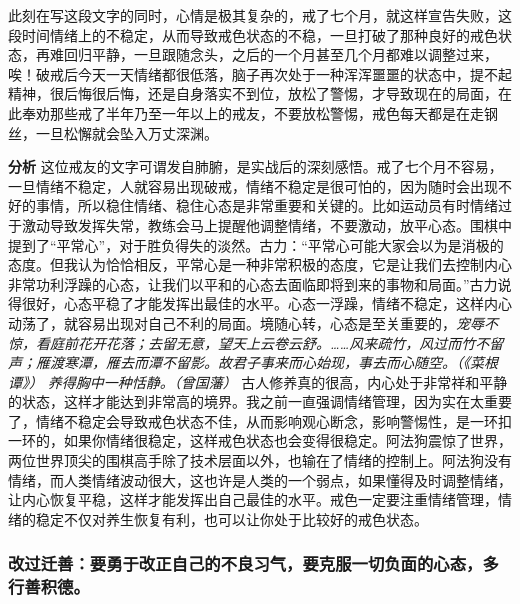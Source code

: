 \begin{case}[情绪管理]
    此刻在写这段文字的同时，心情是极其复杂的，戒了七个月，就这样宣告失败，这段时间情绪上的不稳定，从而导致戒色状态的不稳，一旦打破了那种良好的戒色状态，再难回归平静，一旦跟随念头，之后的一个月甚至几个月都难以调整过来，唉！破戒后今天一天情绪都很低落，脑子再次处于一种浑浑噩噩的状态中，提不起精神，很后悔很后悔，还是自身落实不到位，放松了警惕，才导致现在的局面，在此奉劝那些戒了半年乃至一年以上的戒友，不要放松警惕，戒色每天都是在走钢丝，一旦松懈就会坠入万丈深渊。

    \textbf{分析} 这位戒友的文字可谓发自肺腑，是实战后的深刻感悟。戒了七个月不容易，一旦情绪不稳定，人就容易出现破戒，情绪不稳定是很可怕的，因为随时会出现不好的事情，所以稳住情绪、稳住心态是非常重要和关键的。比如运动员有时情绪过于激动导致发挥失常，教练会马上提醒他调整情绪，不要激动，放平心态。围棋中提到了“平常心”，对于胜负得失的淡然。古力：“平常心可能大家会以为是消极的态度。但我认为恰恰相反，平常心是一种非常积极的态度，它是让我们去控制内心非常功利浮躁的心态，让我们以平和的心态去面临即将到来的事物和局面。”古力说得很好，心态平稳了才能发挥出最佳的水平。心态一浮躁，情绪不稳定，这样内心动荡了，就容易出现对自己不利的局面。境随心转，心态是至关重要的，\textit{宠辱不惊，看庭前花开花落；去留无意，望天上云卷云舒。……风来疏竹，风过而竹不留声；雁渡寒潭，雁去而潭不留影。故君子事来而心始现，事去而心随空。（《菜根谭》）} \textit{养得胸中一种恬静。（曾国藩）} 古人修养真的很高，内心处于非常祥和平静的状态，这样才能达到非常高的境界。我之前一直强调情绪管理，因为实在太重要了，情绪不稳定会导致戒色状态不佳，从而影响观心断念，影响警惕性，是一环扣一环的，如果你情绪很稳定，这样戒色状态也会变得很稳定。阿法狗震惊了世界，两位世界顶尖的围棋高手除了技术层面以外，也输在了情绪的控制上。阿法狗没有情绪，而人类情绪波动很大，这也许是人类的一个弱点，如果懂得及时调整情绪，让内心恢复平稳，这样才能发挥出自己最佳的水平。戒色一定要注重情绪管理，情绪的稳定不仅对养生恢复有利，也可以让你处于比较好的戒色状态。
\end{case}

\subsubsection{改过迁善：要勇于改正自己的不良习气，要克服一切负面的心态，多行善积德。}

